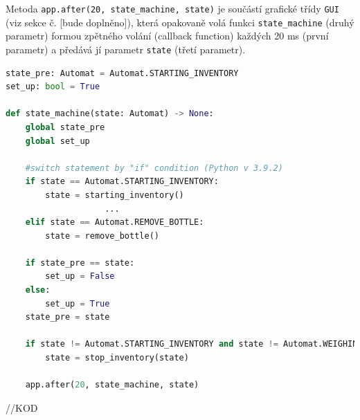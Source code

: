 
Metoda \texttt{app.after(20, state\_machine, state)} je součástí grafické třídy \texttt{GUI} (viz sekce č. [bude doplněno]), která opakovaně volá funkci \texttt{state\_machine} (druhý parametr) formou zpětného volání (callback function) každých 20 ms (první parametr) a předává jí parametr \texttt{state} (třetí parametr).






\begin{lstlisting}[language=Python, caption=Funkce stavového automatu, frame=single, breaklines=true, postbreak=\mbox{\textcolor{gray}{$\hookrightarrow$}\space}]
state_pre: Automat = Automat.STARTING_INVENTORY
set_up: bool = True

def state_machine(state: Automat) -> None:
    global state_pre
    global set_up
    
    #switch statement by "if" condition (Python v 3.9.2)
    if state == Automat.STARTING_INVENTORY:
        state = starting_inventory()
                    ...
    elif state == Automat.REMOVE_BOTTLE:
        state = remove_bottle()

    if state_pre == state:
        set_up = False
    else:
        set_up = True
    state_pre = state
    
    if state != Automat.STARTING_INVENTORY and state != Automat.WEIGHING and app.button_stop_pressed:
        state = stop_inventory(state)

    app.after(20, state_machine, state)
\end{lstlisting}



//KOD

